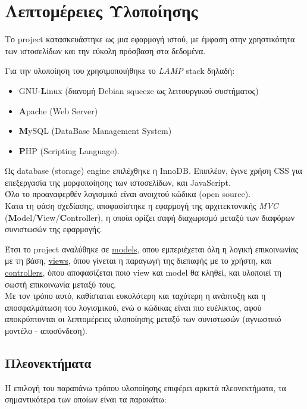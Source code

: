 \documentclass[a4paper]{article}
\begin{document}




\section{Λεπτομέρειες Υλοποίησης}

Το project κατασκευάστηκε ως μια εφαρμογή ιστού, με έμφαση στην χρηστικότητα
των ιστοσελίδων και την εύκολη πρόσβαση στα δεδομένα.

Για την υλοποίηση του χρησιμοποιήθηκε το \emph{LAMP} stack δηλαδή:
\begin{itemize}
\item GNU-\textbf{L}inux (διανομή Debian squeeze ως λειτουργικού συστήματος)
\item \textbf{A}pache (Web Server)
\item \textbf{M}ySQL (DataBase Management System)
\item \textbf{P}HP (Scripting Language).
\end{itemize}
Ως database (storage) engine επιλέχθηκε η InnoDB.
Επιπλέον, έγινε χρήση CSS για επεξεργασία της μορφοποίησης των ιστοσελίδων,
και JavaScript.\\
Όλο το προαναφερθέν λογισμικό είναι ανοιχτού κώδικα (open source).\\

Κατα τη φάση σχεδίασης, αποφασίστηκε η εφαρμογή της αρχιτεκτονικής \emph{MVC}
(\textbf{M}odel/\textbf{V}iew/\textbf{C}ontroller), η οποία ορίζει σαφή
διαχωρισμό μεταξύ των διαφόρων συνιστωσών της εφαρμογής.

Έτσι το project αναλύθηκε σε \underline{models}, οπου εμπεριέχεται όλη η λογική
επικοινωνίας με τη βάση, \underline{views}, όπου γίνεται η παραγωγή της διεπαφής
με το χρήστη, και \underline{controllers}, όπου αποφασίζεται ποιο view και model
θα κληθεί, και υλοποιεί τη σωστή επικοινωνία μεταξύ τους.\\

Με τον τρόπο αυτό, καθίσταται ευκολότερη και ταχύτερη η ανάπτυξη και η
αποσφαλμάτωση του λογισμικού, ενώ ο κώδικας είναι πιο ευέλικτος, αφού
αποκρύπτονται οι λεπτομέρειες υλοποίησης μεταξύ των συνιστωσών (αγνωστικό
μοντέλο - αποσύνδεση).

\subsection{Πλεονεκτήματα}
Η επιλογή του παραπάνω τρόπου υλοποίησης επιφέρει αρκετά πλεονεκτήματα, τα
σημαντικότερα των οποίων είναι τα παρακάτω:
\end{document}
